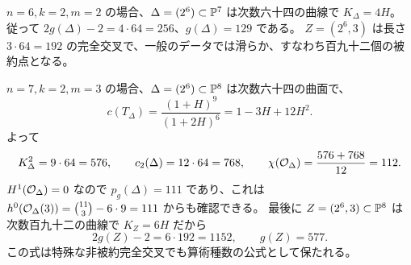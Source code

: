 $n=6,k=2,m=2$ の場合、$\Delta=(2^6)\subset\mathbb P^7$ は次数六十四の曲線で $K_\Delta=4H$。
従って $2g(\Delta)-2=4\cdot64=256$、$g(\Delta)=129$ である。
$Z=(2^6,3)$ は長さ $3\cdot64=192$ の完全交叉で、一般のデータでは滑らか、すなわち百九十二個の被約点となる。

$n=7,k=2,m=3$ の場合、$\Delta=(2^6)\subset\mathbb P^8$ は次数六十四の曲面で、
\[
c(T_\Delta)=\frac{(1+H)^9}{(1+2H)^6}=1-3H+12H^2.
\]
よって
\[
K_\Delta^2=9\cdot64=576,\qquad c_2(\Delta)=12\cdot64=768,\qquad
\chi(\mathcal O_\Delta)=\frac{576+768}{12}=112.
\]
$H^1(\mathcal O_\Delta)=0$ なので $p_g(\Delta)=111$ であり、これは
$h^0(\mathcal O_\Delta(3))=\binom{11}{3}-6\cdot9=111$ からも確認できる。
最後に $Z=(2^6,3)\subset\mathbb P^8$ は次数百九十二の曲線で $K_Z=6H$ だから
\[
2g(Z)-2=6\cdot192=1152,\qquad g(Z)=577.
\]
この式は特殊な非被約完全交叉でも算術種数の公式として保たれる。
